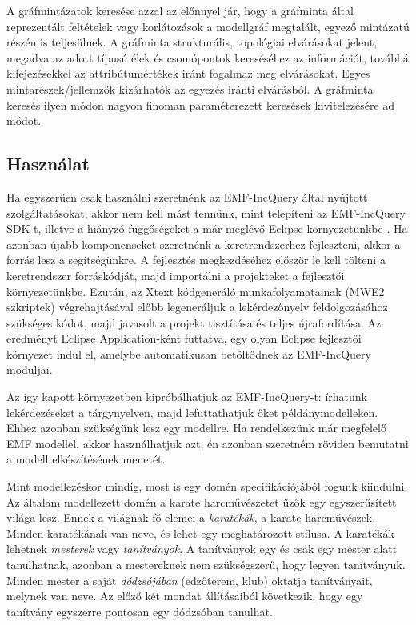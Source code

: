 A gráfmintázatok keresése azzal az előnnyel jár, hogy a gráfminta által reprezentált feltételek vagy korlátozások a modellgráf megtalált, egyező mintázatú részén is teljesülnek.
A gráfminta strukturális, topológiai elvárásokat jelent, megadva az adott típusú élek és csomópontok kereséséhez az információt, továbbá kifejezésekkel az attribútumértékek iránt fogalmaz meg elvárásokat.
Egyes mintarészek/jellemzők kizárhatók az egyezés iránti elvárásból.
A gráfminta keresés ilyen módon nagyon finoman paraméterezett keresések kivitelezésére ad módot.

\subsection{Használat}

Ha egyszerűen csak használni szeretnénk az EMF-IncQuery által nyújtott szolgáltatásokat, akkor nem kell mást tennünk, mint telepíteni az EMF-IncQuery SDK-t, illetve a hiányzó függőségeket a már meglévő Eclipse környezetünkbe \cite{EclipseOrgIncQueryInstall}.
Ha azonban újabb komponenseket szeretnénk a keretrendszerhez fejleszteni, akkor a \cite{EclipseOrgIncQueryDevEnv} forrás lesz a segítségünkre.
A fejlesztés megkezdéséhez először le kell tölteni a keretrendszer forráskódját, majd importálni a projekteket a fejlesztői környezetünkbe.
Ezután, az Xtext kódgeneráló munkafolyamatainak (MWE2 szkriptek) végrehajtásával előbb legeneráljuk a lekérdezőnyelv feldolgozásához szükséges kódot, majd javasolt a projekt tisztítása és teljes újrafordítása.
Az eredményt Eclipse Application-ként futtatva, egy olyan Eclipse fejlesztői környezet indul el, amelybe automatikusan betöltődnek az EMF-IncQuery moduljai.

Az így kapott környezetben kipróbálhatjuk az EMF-IncQuery-t: írhatunk lekérdezéseket a tárgynyelven, majd lefuttathatjuk őket példánymodelleken.
Ehhez azonban szükségünk lesz egy modellre.
Ha rendelkezünk már megfelelő \gls{EMF} modellel, akkor használhatjuk azt, én azonban szeretném röviden bemutatni a modell elkészítésének menetét.

Mint modellezéskor mindig, most is egy domén specifikációjából fogunk kiindulni.
Az általam modellezett domén a karate harcművészetet űzők egy egyszerűsített világa lesz.
Ennek a világnak fő elemei a \emph{karatékák}, a karate harcművészek.
Minden karatékának van neve, és lehet egy meghatározott stílusa.
A karatékák lehetnek \emph{mesterek} vagy \emph{tanítványok}.
A tanítványok egy és csak egy mester alatt tanulhatnak, azonban a mestereknek nem szükségszerű, hogy legyen tanítványuk.
Minden mester a saját \emph{dódzsójában} (edzőterem, klub) oktatja tanítványait, melynek van neve.
Az előző két mondat állításaiból következik, hogy egy tanítvány egyszerre pontosan egy dódzsóban tanulhat.


